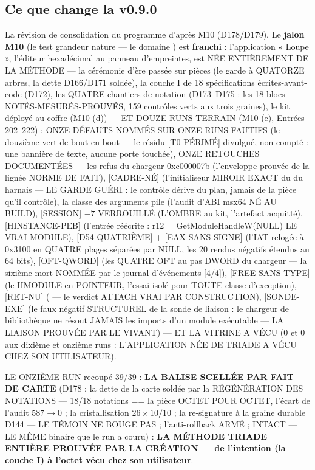 \subsection{Ce que change la v0.9.0}\label{sec:nouveautes090}

La révision de consolidation du programme d'après M10 (D178/D179). Le \textbf{jalon
M10} (le test grandeur nature — le domaine ) est \textbf{franchi} :
l'application « Loupe », l'éditeur hexadécimal au panneau d'empreintes, est NÉE
ENTIÈREMENT DE LA MÉTHODE — la cérémonie d'ère passée sur pièces (le garde à
QUATORZE arbres, la dette D166/D171 soldée), la couche I de 18 spécifications
écrites-avant-code (D172), les QUATRE chantiers de notation (D173–D175 : les 18
blocs NOTÉS-MESURÉS-PROUVÉS, 159 contrôles verts aux trois graines), le kit déployé
au coffre  (M10-(d)) — ET DOUZE RUNS TERRAIN (M10-(e), Entrées 202–222) :
ONZE DÉFAUTS NOMMÉS SUR ONZE RUNS FAUTIFS (le douzième vert de bout en bout —
le résidu [T0-PÉRIMÉ] divulgué, non compté : une bannière de texte, aucune
porte touchée), ONZE RETOUCHES DOCUMENTÉES — les refus du chargeur
0xc000007b (l'enveloppe prouvée de la lignée NORME DE FAIT), [CADRE-NÉ]
(l'initialiseur  MIROIR EXACT du  du harnais — LE
GARDE GUÉRI : le contrôle dérive du plan, jamais de la pièce qu'il contrôle), la
classe des arguments pile (l'audit d'ABI msx64 NÉ AU BUILD), [SESSION] $-7$
VERROUILLÉ (L'OMBRE au kit, l'artefact acquitté), [HINSTANCE-PEB] (l'entrée
réécrite : r12 = GetModuleHandleW(NULL) LE VRAI MODULE), [D54-QUATRIÈME] +
[EAX-SANS-SIGNE] (l'IAT relogée à 0x3100 en QUATRE plages séparées par NULL, les 20
rendus négatifs étendus au 64 bits), [OFT-QWORD] (les QUATRE OFT au pas DWORD du
chargeur — la sixième mort NOMMÉE par le journal d'événements [4/4]),
[FREE-SANS-TYPE] (le HMODULE en POINTEUR, l'essai isolé pour TOUTE classe
d'exception), [RET-NU] ( — le verdict ATTACH VRAI PAR
CONSTRUCTION), [SONDE-EXE] (le faux négatif STRUCTUREL de la sonde de liaison : le
chargeur de bibliothèque ne résout JAMAIS les imports d'un module exécutable — LA
LIAISON PROUVÉE PAR LE VIVANT) — ET LA VITRINE A VÉCU (0 et 0 aux dixième et
onzième runs : L'APPLICATION NÉE DE TRIADE A VÉCU CHEZ SON UTILISATEUR).

LE ONZIÈME RUN recoupé 39/39 : \textbf{LA BALISE  SCELLÉE PAR
FAIT DE CARTE} (D178 : la dette de la carte soldée par la RÉGÉNÉRATION DES
NOTATIONS — 18/18 notations == la pièce OCTET POUR OCTET, l'écart de l'audit
$587 \to 0$ ; la cristallisation $26 \times 10/10$ ; la re-signature à la graine
durable D144 — LE TÉMOIN NE BOUGE PAS ; l'anti-rollback ARMÉ ; 
INTACT  — LE MÊME binaire que le run a couru) : \textbf{LA MÉTHODE
TRIADE ENTIÈRE PROUVÉE PAR LA CRÉATION — de l'intention (la couche I) à l'octet
vécu chez son utilisateur}.

